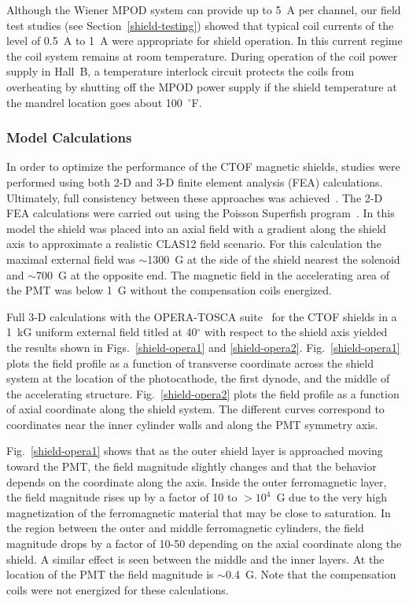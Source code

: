 \documentclass{elsart}
\begin{document}
Although the Wiener MPOD system can provide up to 5~A per channel, our field test studies
(see Section~\ref{shield-testing}) showed that typical coil currents of the level of 0.5~A
to 1~A were appropriate for shield operation. In this current regime the coil system remains
at room temperature. During operation of the coil power supply in Hall~B, a temperature
interlock circuit protects the coils from overheating by shutting off the MPOD power supply if
the shield temperature at the mandrel location goes about 100~$^{\circ}$F.

\subsubsection{Model Calculations}

In order to optimize the performance of the CTOF magnetic shields, studies were performed 
using both 2-D and 3-D finite element analysis (FEA) calculations. Ultimately, full 
consistency between these approaches was achieved~\cite{cn2015-003}. The 2-D FEA calculations 
were carried out using the Poisson Superfish program~\cite{poisson}. In this model the shield 
was placed into an axial field with a gradient along the shield axis to approximate a realistic 
CLAS12 field scenario. For this calculation the maximal external field was $\sim$1300~G at the 
side of the shield nearest the solenoid and $\sim$700~G at the opposite end. The magnetic field 
in the accelerating area of the PMT was below 1~G without the compensation coils energized. 

Full 3-D calculations with the OPERA-TOSCA suite~\cite{opera} for the CTOF shields in a 1~kG
uniform external field titled at 40$^\circ$ with respect to the shield axis yielded the results 
shown in Figs.~\ref{shield-opera1} and \ref{shield-opera2}. Fig.~\ref{shield-opera1} plots the 
field profile as a function of transverse coordinate across the shield system at the location 
of the photocathode, the first dynode, and the middle of the accelerating structure. 
Fig.~\ref{shield-opera2} plots the field profile as a function of axial coordinate along the 
shield system. The different curves correspond to coordinates near the inner cylinder 
walls and along the PMT symmetry axis.

Fig.~\ref{shield-opera1} shows that as the outer shield layer is approached moving toward the
PMT, the field magnitude slightly changes and that the behavior depends on the coordinate along 
the axis. Inside the outer ferromagnetic layer, the field magnitude rises up by a factor of 
10 to $>10^4$~G due to the very high magnetization of the ferromagnetic material that may be 
close to saturation. In the region between the outer and middle ferromagnetic cylinders, the 
field magnitude drops by a factor of 10-50 depending on the axial coordinate along the shield. 
A similar effect is seen between the middle and the inner layers. At the location of the PMT 
the field magnitude is $\sim$0.4~G. Note that the compensation coils were not energized for 
these calculations. 
\end{document}
